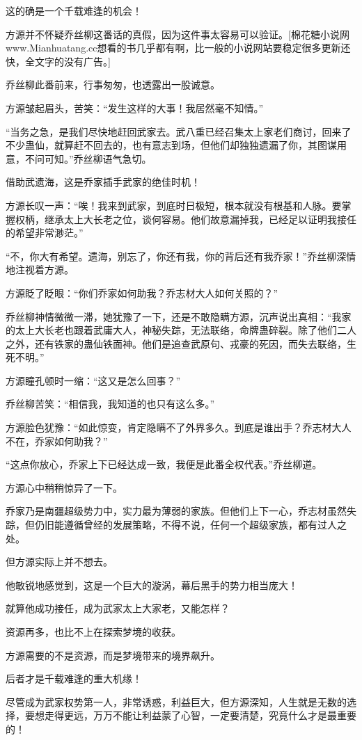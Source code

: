 \begin{this_body}
这的确是一个千载难逢的机会！

方源并不怀疑乔丝柳这番话的真假，因为这件事太容易可以验证。[棉花糖小说网www.Mianhuatang.cc想看的书几乎都有啊，比一般的小说网站要稳定很多更新还快，全文字的没有广告。]

乔丝柳此番前来，行事匆匆，也透露出一股诚意。

方源皱起眉头，苦笑：“发生这样的大事！我居然毫不知情。”

“当务之急，是我们尽快地赶回武家去。武八重已经召集太上家老们商讨，回来了不少蛊仙，就算赶不回去的，也有意志到场，但他们却独独遗漏了你，其图谋用意，不问可知。”乔丝柳语气急切。

借助武遗海，这是乔家插手武家的绝佳时机！

方源长叹一声：“唉！我来到武家，到底时日极短，根本就没有根基和人脉。要掌握权柄，继承太上大长老之位，谈何容易。他们故意漏掉我，已经足以证明我接任的希望非常渺茫。”

“不，你大有希望。遗海，别忘了，你还有我，你的背后还有我乔家！”乔丝柳深情地注视着方源。

方源眨了眨眼：“你们乔家如何助我？乔志材大人如何关照的？”

乔丝柳神情微微一滞，她犹豫了一下，还是不敢隐瞒方源，沉声说出真相：“我家的太上大长老也跟着武庸大人，神秘失踪，无法联络，命牌蛊碎裂。除了他们二人之外，还有铁家的蛊仙铁面神。他们是追查武原句、戎豪的死因，而失去联络，生死不明。”

方源瞳孔顿时一缩：“这又是怎么回事？”

乔丝柳苦笑：“相信我，我知道的也只有这么多。”

方源脸色犹豫：“如此惊变，肯定隐瞒不了外界多久。到底是谁出手？乔志材大人不在，乔家如何助我？”

“这点你放心，乔家上下已经达成一致，我便是此番全权代表。”乔丝柳道。

方源心中稍稍惊异了一下。

乔家乃是南疆超级势力中，实力最为薄弱的家族。但他们上下一心，乔志材虽然失踪，但仍旧能遵循曾经的发展策略，不得不说，任何一个超级家族，都有过人之处。

但方源实际上并不想去。

他敏锐地感觉到，这是一个巨大的漩涡，幕后黑手的势力相当庞大！

就算他成功接任，成为武家太上大家老，又能怎样？

资源再多，也比不上在探索梦境的收获。

方源需要的不是资源，而是梦境带来的境界飙升。

后者才是千载难逢的重大机缘！

尽管成为武家权势第一人，非常诱惑，利益巨大，但方源深知，人生就是无数的选择，要想走得更远，万万不能让利益蒙了心智，一定要清楚，究竟什么才是最重要的！


\end{this_body}
